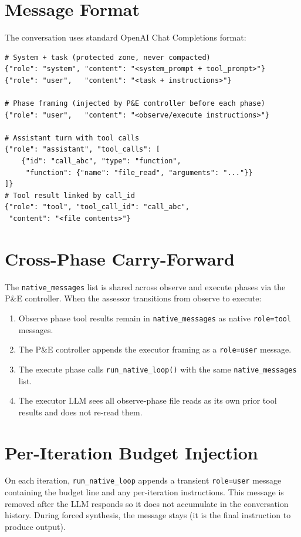 \documentclass[11pt,letterpaper]{report}
\newcommand{\code}[1]{\texttt{#1}}
\begin{document}
\section{Message Format}

The conversation uses standard OpenAI Chat Completions format:

\begin{lstlisting}
# System + task (protected zone, never compacted)
{"role": "system", "content": "<system_prompt + tool_prompt>"}
{"role": "user",   "content": "<task + instructions>"}

# Phase framing (injected by P&E controller before each phase)
{"role": "user",   "content": "<observe/execute instructions>"}

# Assistant turn with tool calls
{"role": "assistant", "tool_calls": [
    {"id": "call_abc", "type": "function",
     "function": {"name": "file_read", "arguments": "..."}}
]}
# Tool result linked by call_id
{"role": "tool", "tool_call_id": "call_abc",
 "content": "<file contents>"}
\end{lstlisting}

\section{Cross-Phase Carry-Forward}

The \code{native\_messages} list is shared across observe and execute
phases via the P\&E controller. When the assessor transitions from observe
to execute:
\begin{enumerate}
  \item Observe phase tool results remain in \code{native\_messages} as
    native \code{role=tool} messages.
  \item The P\&E controller appends the executor framing as a
    \code{role=user} message.
  \item The execute phase calls \code{run\_native\_loop()} with the same
    \code{native\_messages} list.
  \item The executor LLM sees all observe-phase file reads as its own prior
    tool results and does not re-read them.
\end{enumerate}

\section{Per-Iteration Budget Injection}

On each iteration, \code{run\_native\_loop} appends a transient
\code{role=user} message containing the budget line and any per-iteration
instructions. This message is removed after the LLM responds so it does
not accumulate in the conversation history. During forced synthesis, the
message stays (it is the final instruction to produce output).
\end{document}

